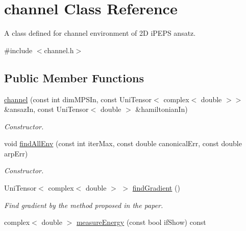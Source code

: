 \hypertarget{classchannel}{}\section{channel Class Reference}
\label{classchannel}


A class defined for channel environment of 2D i\+P\+E\+PS ansatz.  




{\ttfamily \#include $<$channel.\+h$>$}

\subsection*{Public Member Functions}
\begin{DoxyCompactItemize}
\item 
\hyperlink{classchannel_ad9475139ac4d1f4d96795af6cad4b71d}{channel} (const int dim\+M\+P\+S\+In, const Uni\+Tensor$<$ complex$<$ double $>$$>$ \&ansaz\+In, const Uni\+Tensor$<$ double $>$ \&hamiltonian\+In)
\begin{DoxyCompactList}\small\item\em Constructor. \end{DoxyCompactList}\item 
void \hyperlink{classchannel_a9969f44b4db5e903e7eb05e4f255d38d}{find\+All\+Env} (const int iter\+Max, const double canonical\+Err, const double arp\+Err)
\begin{DoxyCompactList}\small\item\em Constructor. \end{DoxyCompactList}\item 
Uni\+Tensor$<$ complex$<$ double $>$ $>$ \hyperlink{classchannel_a5de3f9a140017718a2e9e1cb5ab011a6}{find\+Gradient} ()\hypertarget{classchannel_a5de3f9a140017718a2e9e1cb5ab011a6}{}\label{classchannel_a5de3f9a140017718a2e9e1cb5ab011a6}

\begin{DoxyCompactList}\small\item\em Find gradient by the method proposed in the paper. \end{DoxyCompactList}\item 
complex$<$ double $>$ \hyperlink{classchannel_a53759f2775fb4ee5340b2f58613cc76e}{measure\+Energy} (const bool if\+Show) const \hypertarget{classchannel_a53759f2775fb4ee5340b2f58613cc76e}{}\label{classchannel_a53759f2775fb4ee5340b2f58613cc76e}


\end{DoxyCompactItemize}
